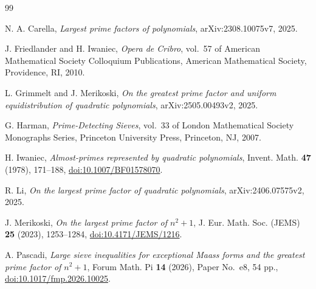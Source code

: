 \documentclass[10pt,reqno]{amsart}
\newcommand{\1}{\mathbf{1}}
\theoremstyle{plain}
\theoremstyle{remark}
\begin{document}
\begin{thebibliography}{99}

N. A. Carella,
\emph{Largest prime factors of polynomials},
arXiv:2308.10075v7, 2025.

J. Friedlander and H. Iwaniec,
\emph{Opera de Cribro},
vol.~57 of American Mathematical Society Colloquium Publications,
American Mathematical Society, Providence, RI, 2010.

L. Grimmelt and J. Merikoski,
\emph{On the greatest prime factor and uniform equidistribution of quadratic polynomials},
arXiv:2505.00493v2, 2025.

G. Harman,
\emph{Prime-Detecting Sieves},
vol.~33 of London Mathematical Society Monographs Series,
Princeton University Press, Princeton, NJ, 2007.

H. Iwaniec,
\emph{Almost-primes represented by quadratic polynomials},
Invent. Math. \textbf{47} (1978), 171--188,
\href{https://doi.org/10.1007/BF01578070}{doi:10.1007/BF01578070}.

R. Li,
\emph{On the largest prime factor of quadratic polynomials},
arXiv:2406.07575v2, 2025.

J. Merikoski,
\emph{On the largest prime factor of $n^2+1$},
J. Eur. Math. Soc. (JEMS) \textbf{25} (2023), 1253--1284,
\href{https://doi.org/10.4171/JEMS/1216}{doi:10.4171/JEMS/1216}.

A. Pascadi,
\emph{Large sieve inequalities for exceptional Maass forms and the greatest prime factor of $n^2+1$},
Forum Math. Pi \textbf{14} (2026), Paper No.~e8, 54 pp.,
\href{https://doi.org/10.1017/fmp.2026.10025}{doi:10.1017/fmp.2026.10025}.

\end{thebibliography}
\end{document}
